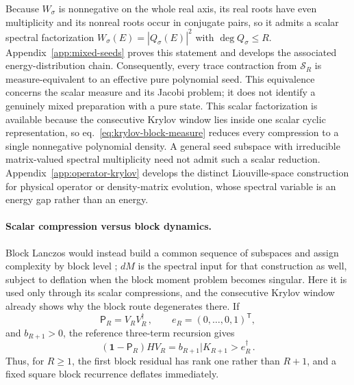 \documentclass[a4paper,11pt]{article}
\def\ket#1{|#1>}%
\def\dd{d}%
\theoremstyle{definition}
\theoremstyle{remark}
\newcommand{\ket}[1]{|#1\rangle}
\newcommand{\dd}{\mathrm d}
\newcommand{\Id}{\mathbf 1}
\begin{document}
Because $W_\sigma$ is nonnegative on the whole real axis, its real roots have even multiplicity and its nonreal roots occur in conjugate pairs, so it admits a scalar spectral factorization $W_\sigma(E)=|Q_\sigma(E)|^2$ with $\deg Q_\sigma\le R$. Appendix~\ref{app:mixed-seeds}
proves this statement and develops the associated energy-distribution
chain. Consequently, every trace contraction from $\mathcal S_R$ is
measure-equivalent to an effective pure polynomial seed. This
equivalence concerns the scalar measure and its
Jacobi problem; it does not identify a genuinely mixed preparation with
a pure state. %
This scalar factorization is available because the consecutive Krylov window lies inside one
scalar cyclic representation, so eq.~\eqref{eq:krylov-block-measure} reduces every compression to
a single nonnegative polynomial density.  A general seed subspace with irreducible matrix-valued
spectral multiplicity need not admit such a scalar reduction. 
Appendix~\ref{app:operator-krylov} develops the distinct
Liouville-space construction for physical operator or density-matrix
evolution, whose spectral variable is an energy gap rather than an
energy.

\paragraph{Scalar compression versus block dynamics.}
Block Lanczos would instead build a common sequence of subspaces and assign complexity by
block level \cite{CrapsEvninPascuzzi2024}; $\dd M$ is the spectral input for that construction as
well, subject to deflation when the block moment problem becomes singular. Here it is used only
through its scalar compressions, and the consecutive Krylov window already shows why the block route degenerates there. If  
\begin{equation}
   \mathsf P_R=V_RV_R^\dagger\,,\qquad
   e_R=(0,\ldots,0,1)^{\mathsf T},
\end{equation}
and $b_{R+1}>0$, the reference three-term recursion gives
\begin{equation}
   (\Id-\mathsf P_R)HV_R
   =b_{R+1}\ket{K_{R+1}}e_R^\dagger\,.
   \label{eq:krylov-window-block-deflation-main}
\end{equation}
Thus, for $R\ge1$, the first block residual has rank one rather than
$R+1$, and a fixed square block recurrence deflates immediately.  
\end{document}
